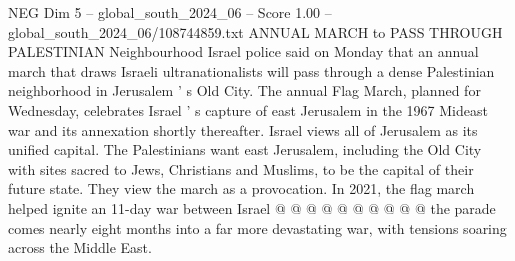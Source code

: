 \begin{textsample}{NEG Dim 5 – global\_south\_2024\_06 – Score 1.00 – global\_south\_2024\_06/108744859.txt}
ANNUAL MARCH to PASS THROUGH PALESTINIAN Neighbourhood Israel police said on Monday that an annual march that draws Israeli ultranationalists will pass through a dense Palestinian neighborhood in Jerusalem ' s Old City.
The annual Flag March, planned for Wednesday, celebrates Israel ' s capture of east Jerusalem in the 1967 Mideast war and its annexation shortly thereafter.
Israel views all of Jerusalem as its unified capital.
The Palestinians want east Jerusalem, including the Old City with sites sacred to Jews, Christians and Muslims, to be the capital of their future state.
They view the march as a provocation.
In 2021, the flag march helped ignite an 11-day war between Israel @ @ @ @ @ @ @ @ @ @ the parade comes nearly eight months into a far more devastating war, with tensions soaring across the Middle East.

\end{textsample}
